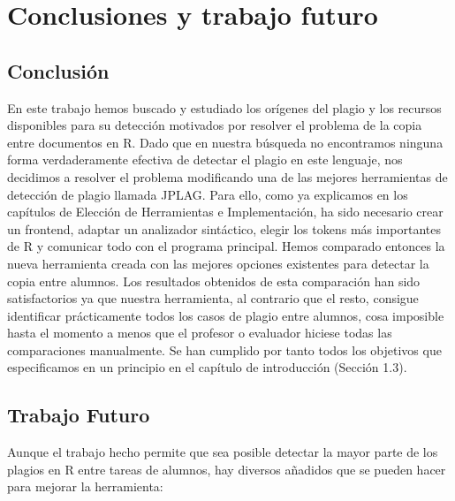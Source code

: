 \chapter{Conclusiones y trabajo futuro}

\section{Conclusión}
En este trabajo hemos buscado y estudiado los orígenes del plagio y los recursos disponibles para su detección motivados por resolver el problema de la copia entre documentos en R.
\newline
Dado que en nuestra búsqueda no encontramos ninguna forma verdaderamente efectiva de detectar el plagio en este lenguaje, nos decidimos a resolver el problema modificando una de las mejores herramientas de detección de plagio llamada JPLAG.
\newline
Para ello, como ya explicamos en los capítulos de Elección de Herramientas e Implementación, ha sido necesario crear un frontend, adaptar un analizador sintáctico, elegir los tokens más importantes de R y comunicar todo con el programa principal.
\newline
Hemos comparado entonces la nueva herramienta creada con las mejores opciones existentes para detectar la copia entre alumnos.
\newline
Los resultados obtenidos de esta comparación han sido satisfactorios ya que nuestra herramienta, al contrario que el resto, consigue identificar prácticamente todos los casos de plagio entre alumnos, cosa imposible hasta el momento a menos que el profesor o evaluador hiciese todas las comparaciones manualmente.
\newline
\newline
Se han cumplido por tanto todos los objetivos que especificamos en un principio en el capítulo de introducción (Sección 1.3).


\section{Trabajo Futuro}

Aunque el trabajo hecho permite que sea posible detectar la mayor parte de los plagios en R entre tareas de alumnos, hay diversos añadidos que se pueden hacer para mejorar la herramienta:

